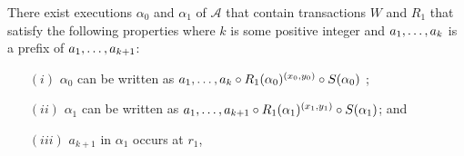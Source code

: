 \begin{lemma} \label{lem:exec3_alpha1} 
There exist  executions $\alpha_0$ and $\alpha_1$ of $\mathcal{A}$ that contain transactions $W$ and  $R_1$ 
that satisfy the following properties where $k$ is some positive integer and $\finiteprefixt{k-1}{k}$ is a prefix of $\finiteprefixt{k}{k+1}$:
\begin{enumerate}
\item[$(i)$] $\alpha_0$ can be written as 
$\finiteprefixt{k-1}{k} \circ 
\frage{R_1}{\alpha_0}{x_0, y_0}
 \circ \frage{S}{\alpha_0}{}$ ;
\item[$(ii)$]   $\alpha_1$ can be written as 
$\finiteprefixt{k}{k+1} \circ 
\frage{R_1}{\alpha_1}{x_1, y_1}  \circ \frage{S}{\alpha_1}{}$; and  
\item[$(iii)$] $a_{k+1}$ in $\alpha_1$  occurs at  $r_1$, 
\end{enumerate} 
\end{lemma}

